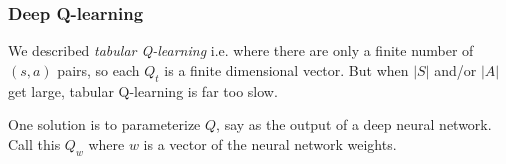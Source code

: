 \documentclass[10pt,english,t,handout]{beamer}
\begin{document}
\begin{frame} \frametitle{Deep Q-learning}
\bi
\item We described {\it tabular Q-learning \/} i.e. where there are only a finite number of $(s,a)$  pairs, so each $Q_t$
is a finite dimensional vector. But when $|S|$ and/or $|A|$ get large, tabular Q-learning is far too slow.
\item One solution is to parameterize $Q$, say as the output of a deep neural network. Call this $Q_w$ where $w$ is
 a vector of the neural network weights. 
\item 

%
%
%

\end{frame}
\end{document}
